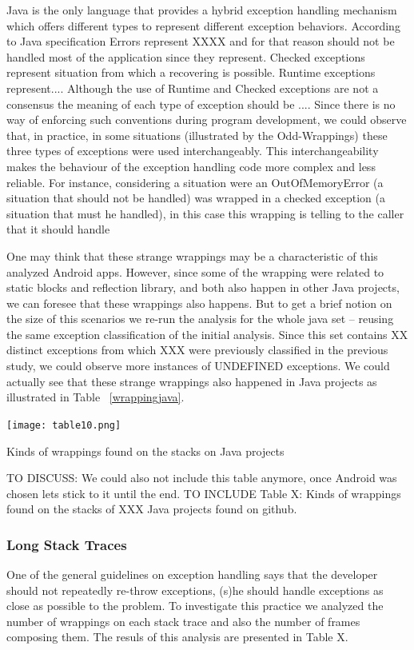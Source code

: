 \documentclass[conference]{IEEEtran}
\begin{document}
Java is the only language that provides a hybrid exception handling mechanism which offers different types to represent different exception behaviors. According to Java specification Errors represent XXXX and for that reason should not be handled most of the application since they represent. Checked exceptions represent situation from which a recovering is possible. Runtime exceptions represent.... Although the use of Runtime and Checked exceptions are not a consensus the meaning of each type of exception should be .... 
Since there is no way of enforcing such conventions during program development,  we could observe that, in practice, in some situations (illustrated by the Odd-Wrappings) these three types of exceptions were used interchangeably. This interchangeability makes the behaviour of the exception handling code more complex and less reliable. For instance, considering a situation were an OutOfMemoryError (a situation that should not be handled) was wrapped in a checked exception (a situation that must he handled), in this case this wrapping is telling to the caller that it should handle

One may think that these strange wrappings may be a characteristic of this analyzed Android apps. However, since some of the wrapping were related to static blocks and reflection library, and both also happen in other Java projects, we can foresee that these wrappings also happens. But to get a brief  notion on the size of this scenarios we re-run the analysis for the whole java set – reusing the same exception classification of the initial analysis. Since this set contains XX distinct exceptions from which XXX were previously classified in the previous study, we could observe more instances of UNDEFINED exceptions. We could actually see that these strange wrappings also happened in Java projects as illustrated in Table ~\ref{wrappingjava}. 
\begin{table}
\centering
\texttt{[image: table10.png]}
\caption{Kinds of wrappings found on the stacks on Java projects}
\label{fig:wrappingjava}
\end{table}

TO DISCUSS: We could also not include this table anymore, once Android was chosen lets stick to it until the end.
TO INCLUDE Table X: Kinds of wrappings found on the stacks of XXX Java projects found on github.

\subsubsection{Long Stack Traces}
One of the general guidelines on exception handling says that the developer should not repeatedly re-throw exceptions, (s)he should handle exceptions as close as possible to the problem. To investigate this practice we analyzed the number of wrappings on each stack trace and also the number of frames composing them. The resuls of this analysis are presented in Table X.
\end{document}
